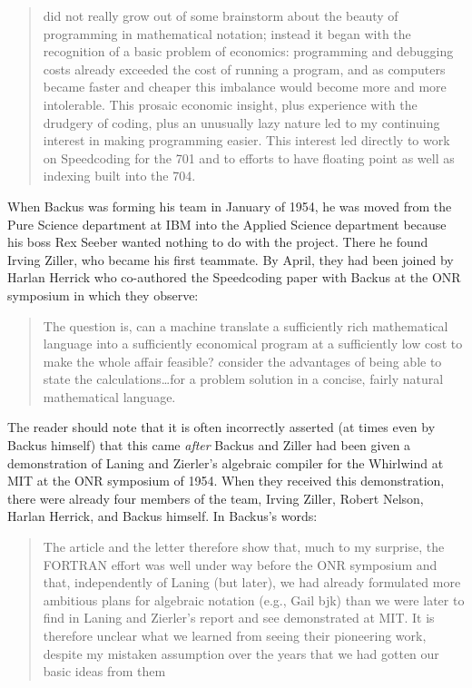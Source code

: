\begin{quotation}
	\FTN{} did not really grow out of some brainstorm about the beauty of
	programming in mathematical notation; instead it began with the recognition
	of a basic problem of economics: programming and debugging costs already
	exceeded the cost of running a program, and as computers became faster
	and cheaper this imbalance would become more and more intolerable. This
	prosaic economic insight, plus experience with the drudgery of coding, plus
	an unusually lazy nature led to my continuing interest in making
	programming easier.
	This interest led directly to work on Speedcoding for the 701
	and to efforts to have floating point as well as indexing built into the 704.
	\cite{Backus_1980_Programming_in_America_in_1950s}
\end{quotation}

When Backus was forming his team in January of 1954, he was moved from the Pure
Science department at IBM into the Applied Science department because his boss
Rex Seeber wanted nothing to do with the project. There he found Irving Ziller,
who became his first teammate. By April, they had been joined by Harlan Herrick
who co-authored the Speedcoding paper with Backus at the ONR symposium
 in which they observe:

\begin{quotation}
	The question is, can a machine translate a sufficiently rich mathematical
	language into a sufficiently economical program at a sufficiently low cost to
	make the whole affair feasible?  consider the advantages of being
	able to state
	the calculations\dots for a problem solution in a concise, fairly natural
	mathematical language.
\end{quotation}

The reader should note that it is often incorrectly asserted (at times even by
Backus himself\cite{Backus_1980_Programming_in_America_in_1950s}) that this
came \textit{after} Backus and Ziller had been given a demonstration of Laning
and Zierler's algebraic compiler for the Whirlwind at MIT at the ONR symposium
of 1954. When they received this demonstration, there were already four members
of the \FTN{} team, Irving Ziller, Robert Nelson, Harlan Herrick, and Backus
himself. In Backus's words\cite{Backus_1980_Programming_in_America_in_1950s}:

\begin{quotation}
	The article and the letter therefore show that, much to my surprise, the
	FORTRAN effort was well under way before the ONR symposium and that,
	independently of Laning (but later), we had already formulated more ambitious
	plans for algebraic notation (e.g., Gail bjk) than we were later to find in
	Laning and Zierler's report and see demonstrated at MIT. It is therefore
	unclear what we learned from seeing their pioneering work, despite my mistaken
	assumption over the years that we had gotten our basic ideas from them
\end{quotation}

